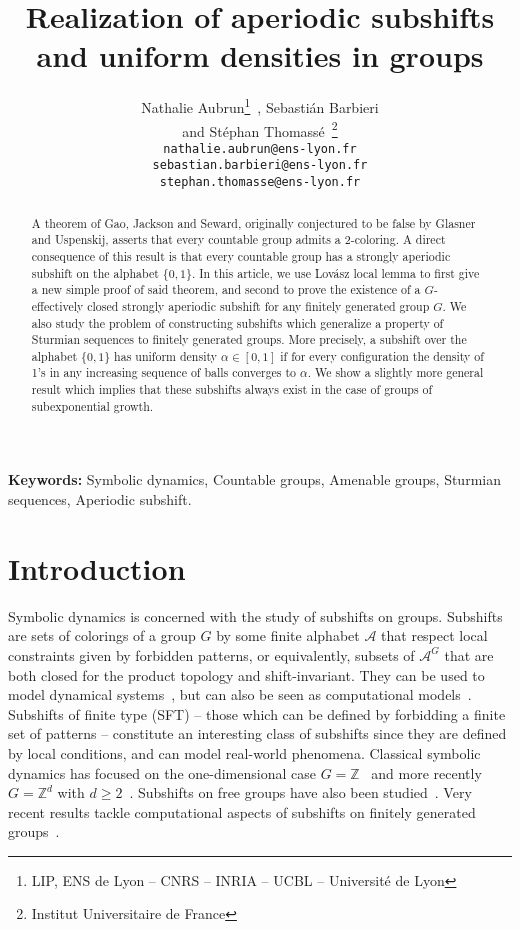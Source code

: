 \documentclass[letterpaper]{article}
\title{Realization of aperiodic subshifts and uniform densities in groups}
\date{}
\author{Nathalie Aubrun\thanks{LIP, ENS de Lyon -- CNRS -- INRIA -- UCBL -- Universit\'e de Lyon}~, Sebasti\'an Barbieri\footnotemark[1]\\ and St\'ephan Thomass\'e\footnotemark[1]~\thanks{Institut Universitaire de France} \\
	\texttt{nathalie.aubrun@ens-lyon.fr}\\ \texttt{sebastian.barbieri@ens-lyon.fr}\\ \texttt{stephan.thomasse@ens-lyon.fr}}
\theoremstyle{plain}
\def\ZZ{\mathbb{Z}}
\def\ag{\mathcal{A}}
\begin{document}
	
	\maketitle 

	\begin{abstract}
		A theorem of Gao, Jackson and Seward, originally conjectured to be false by Glasner and Uspenskij, asserts that every countable group admits a 2-coloring. A direct consequence of this result is that every countable group has a strongly aperiodic subshift on the alphabet $\{0,1\}$. In this article, we use Lov\'asz local lemma to first give a new simple proof of said theorem, and second to prove the existence of a $G$-effectively closed strongly aperiodic subshift for any finitely generated group $G$. We also study the problem of constructing subshifts which generalize a property of Sturmian sequences to finitely generated groups. More precisely, a subshift over the alphabet $\{0,1\}$ has uniform density $\alpha \in [0,1]$ if for every configuration the density of 1's in any increasing sequence of balls converges to $\alpha$. We show a slightly more general result which implies that these subshifts always exist in the case of groups of subexponential growth.
	\end{abstract}	
	
	\textbf{Keywords:} Symbolic dynamics, Countable groups, Amenable groups, Sturmian sequences, Aperiodic subshift.
	
	\section*{Introduction}
	\label{section.introduction}
	
	Symbolic dynamics is concerned with the study of subshifts on groups. Subshifts are sets of colorings of a group $G$ by some finite alphabet $\ag$ that respect local constraints given by forbidden patterns, or equivalently, subsets of $\ag^G$ that are both closed for the product topology and shift-invariant. They can be used to model dynamical systems~\cite{MorseHedlund1938,pollicott1998dynamical}, but can also be seen as computational models~\cite{Hochman2009b}. Subshifts of finite type (SFT) -- those which can be defined by forbidding a finite set of patterns -- constitute an interesting class of subshifts since they are defined by local conditions, and can model real-world phenomena. Classical symbolic dynamics has focused on the one-dimensional case $G=\ZZ$~\cite{MorseHedlund1938,lind1995introduction} and more recently $G=\ZZ^d$ with $d\geq2$~\cite{Hochman2009b,PavlovSchraudner2009}. Subshifts on free groups have also been studied~\cite{Piantadosi2006,Piantadosi2008}. Very recent results tackle 
computational aspects of subshifts on finitely generated groups~\cite{ABS2014, BallierStein2013,Cohen,CarrollPenland,Jeandel2015}.
	
\end{document}
